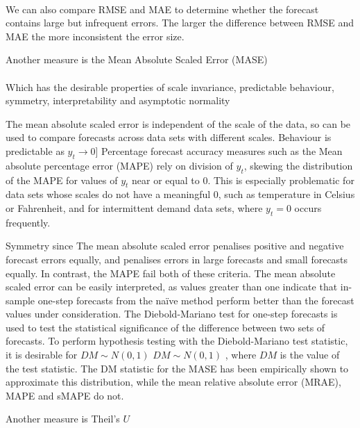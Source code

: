  \\

We can also compare RMSE and MAE to determine whether the forecast contains large but infrequent errors. The larger the difference between RMSE and MAE the more inconsistent the error size.
 
Another measure is the Mean Absolute Scaled Error (MASE) \\

 \\

Which has the desirable properties of scale invariance, predictable behaviour, symmetry, interpretability and asymptotic normality
 
The mean absolute scaled error is independent of the scale of the data, so can be used to compare forecasts across data sets with different scales. Behaviour is predictable as $y_{t}\rightarrow 0$] Percentage forecast accuracy measures such as the Mean absolute percentage error (MAPE) rely on division of $y_{t}$, skewing the distribution of the MAPE for values of $y_{t}$ near or equal to 0. This is especially problematic for data sets whose scales do not have a meaningful 0, such as temperature in Celsius or Fahrenheit, and for intermittent demand data sets, where $y_{t}=0$  occurs frequently.

Symmetry since The mean absolute scaled error penalises positive and negative forecast errors equally, and penalises errors in large forecasts and small forecasts equally. In contrast, the MAPE  fail both of these criteria. The mean absolute scaled error can be easily interpreted, as values greater than one indicate that in-sample one-step forecasts from the naïve method perform better than the forecast values under consideration. The Diebold-Mariano test for one-step forecasts is used to test the statistical significance of the difference between two sets of forecasts. To perform hypothesis testing with the Diebold-Mariano test statistic, it is desirable for $DM ∼ N ( 0 , 1 )$ $DM\sim N(0,1)$ , where $DM$ is the value of the test statistic. The DM statistic for the MASE has been empirically shown to approximate this distribution, while the mean relative absolute error (MRAE), MAPE and sMAPE do not.
 
Another measure is Theil's $U$\\
  

